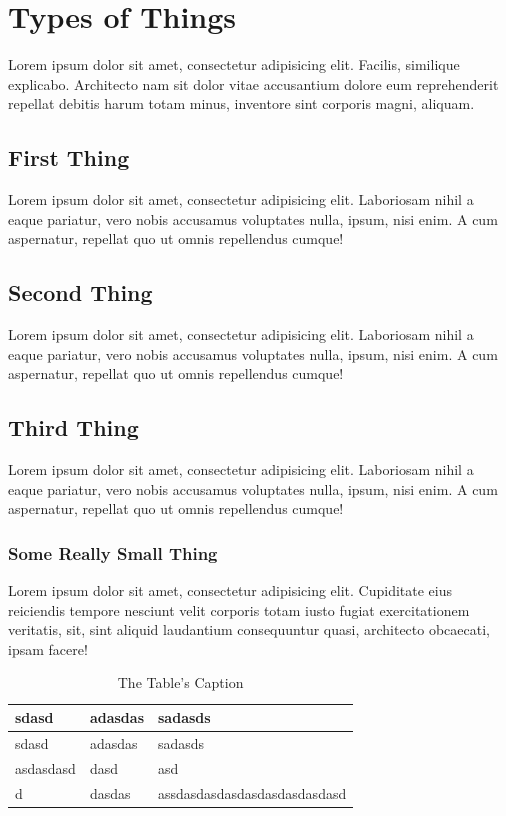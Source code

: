 \section{Types of Things}\label{types-of-things}

Lorem ipsum dolor sit amet, consectetur adipisicing elit. Facilis,
similique explicabo. Architecto nam sit dolor vitae accusantium dolore
eum reprehenderit repellat debitis harum totam minus, inventore sint
corporis magni, aliquam.

\subsection{First Thing}\label{first-thing}

Lorem ipsum dolor sit amet, consectetur adipisicing elit. Laboriosam
nihil a eaque pariatur, vero nobis accusamus voluptates nulla, ipsum,
nisi enim. A cum aspernatur, repellat quo ut omnis repellendus cumque!

\subsection{Second Thing}\label{second-thing}

Lorem ipsum dolor sit amet, consectetur adipisicing elit. Laboriosam
nihil a eaque pariatur, vero nobis accusamus voluptates nulla, ipsum,
nisi enim. A cum aspernatur, repellat quo ut omnis repellendus cumque!

\subsection{Third Thing}\label{third-thing}

Lorem ipsum dolor sit amet, consectetur adipisicing elit. Laboriosam
nihil a eaque pariatur, vero nobis accusamus voluptates nulla, ipsum,
nisi enim. A cum aspernatur, repellat quo ut omnis repellendus cumque!

\subsubsection{Some Really Small Thing}\label{some-really-small-thing}

Lorem ipsum dolor sit amet, consectetur adipisicing elit. Cupiditate
eius reiciendis tempore nesciunt velit corporis totam iusto fugiat
exercitationem veritatis, sit, sint aliquid laudantium consequuntur
quasi, architecto obcaecati, ipsam facere!

\begin{longtable}[]{@{}lll@{}}
\caption{The Table's Caption}\tabularnewline
\toprule
sdasd & adasdas & sadasds\tabularnewline
\midrule
\endfirsthead
\toprule
sdasd & adasdas & sadasds\tabularnewline
\midrule
\endhead
asdasdasd & dasd & asd\tabularnewline
d & dasdas & assdasdasdasdasdasdasdasdasd\tabularnewline
\bottomrule
\end{longtable}

